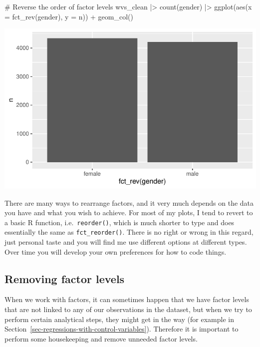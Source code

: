 \documentclass[
  letterpaper,
  DIV=11,
  numbers=noendperiod]{scrreprt}
\newenvironment{Shaded}{\begin{snugshade}}{\end{snugshade}}
\newcommand{\AttributeTok}[1]{\textcolor[rgb]{0.40,0.45,0.13}{#1}}
\newcommand{\CommentTok}[1]{\textcolor[rgb]{0.37,0.37,0.37}{#1}}
\newcommand{\FunctionTok}[1]{\textcolor[rgb]{0.28,0.35,0.67}{#1}}
\newcommand{\NormalTok}[1]{\textcolor[rgb]{0.00,0.23,0.31}{#1}}
\newcommand{\SpecialCharTok}[1]{\textcolor[rgb]{0.37,0.37,0.37}{#1}}
\begin{document}
\begin{Shaded}
\begin{Highlighting}[]
\CommentTok{\# Reverse the order of factor levels}
\NormalTok{wvs\_clean }\SpecialCharTok{|\textgreater{}}
  \FunctionTok{count}\NormalTok{(gender) }\SpecialCharTok{|\textgreater{}}
  \FunctionTok{ggplot}\NormalTok{(}\FunctionTok{aes}\NormalTok{(}\AttributeTok{x =} \FunctionTok{fct\_rev}\NormalTok{(gender),}
             \AttributeTok{y =}\NormalTok{ n)) }\SpecialCharTok{+}
  \FunctionTok{geom\_col}\NormalTok{()}
\end{Highlighting}
\end{Shaded}

\includegraphics{07_data_wrangling_files/figure-pdf/reverse-order-1.pdf}

There are many ways to rearrange factors, and it very much depends on
the data you have and what you wish to achieve. For most of my plots, I
tend to revert to a basic R function, i.e.~\texttt{reorder()}, which is
much shorter to type and does essentially the same as
\texttt{fct\_reorder()}. There is no right or wrong in this regard, just
personal taste and you will find me use different options at different
types. Over time you will develop your own preferences for how to code
things.

\subsection{Removing factor levels}\label{sec-removing-factor-levels}

When we work with factors, it can sometimes happen that we have factor
levels that are not linked to any of our observations in the dataset,
but when we try to perform certain analytical steps, they might get in
the way (for example in
Section~\ref{sec-regressions-with-control-variables}). Therefore it is
important to perform some housekeeping and remove unneeded factor
levels.
\end{document}
